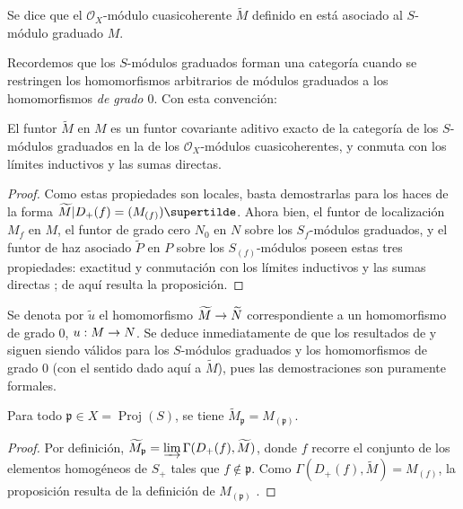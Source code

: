 \documentclass[oneside,10pt]{amsart}
\makeatletter
\newcommand{\ega@arrow}[2]{\mathchoice{#1}{#2}{#2}{#2}}
\renewcommand{\to}{\ega@arrow{\longrightarrow}{\rightarrow}}
\let\EGAOriginalLabel\label
\renewcommand{\label}[1]{\phantomsection\EGAOriginalLabel{#1}}
\makeatother
\begin{document}
\begin{definition}[2.5.3]
\label{II.2.5.3-fr}
Se dice que el $\mathcal{O}_X$-módulo cuasicoherente $\widetilde{M}$ definido en  está asociado al $S$-módulo graduado $M$.
\end{definition}

Recordemos que los $S$-módulos graduados forman una categoría cuando se restringen los homomorfismos arbitrarios de módulos graduados a los homomorfismos \emph{de grado $0$}.
Con esta convención:

\begin{proposition}[2.5.4]
\label{II.2.5.4-fr}
El funtor $\widetilde{M}$ en $M$ es un funtor covariante aditivo exacto de la categoría de los $S$-módulos graduados en la de los $\mathcal{O}_X$-módulos cuasicoherentes, y conmuta con los límites inductivos y las sumas directas.
\end{proposition}

\begin{proof}
Como estas propiedades son locales, basta demostrarlas para los haces de la forma $\widetilde{M}|D_+(f)=(M_{(f)})\supertilde$.
Ahora bien, el funtor de localización $M_f$ en $M$, el funtor de grado cero $N_0$ en $N$ sobre los $S_f$-módulos graduados, y el funtor de haz asociado $\widetilde{P}$ en $P$ sobre los $S_{(f)}$-módulos poseen estas tres propiedades: exactitud y conmutación con los límites inductivos y las sumas directas  ; de aquí resulta la proposición.
\end{proof}

Se denota por $\widetilde{u}$ el homomorfismo $\widetilde{M}\to\widetilde{N}$ correspondiente a un homomorfismo de grado $0$, $u:M\to N$.
Se deduce inmediatamente de  que los resultados de  y  siguen siendo válidos para los $S$-módulos graduados y los homomorfismos de grado $0$ (con el sentido dado aquí a $\widetilde{M}$), pues las demostraciones son puramente formales.

\begin{proposition}[2.5.5]
\label{II.2.5.5-fr}
Para todo $\mathfrak{p}\in X=\operatorname{Proj}(S)$, se tiene $\widetilde{M}_{\mathfrak{p}}=M_{(\mathfrak{p})}$.
\end{proposition}

\begin{proof}
Por definición, $\widetilde{M}_{\mathfrak{p}}=
\varinjlim\Gamma(D_+(f),\widetilde{M})$, donde $f$ recorre el conjunto de los elementos homogéneos de $S_+$ tales que $f\notin\mathfrak{p}$.
Como $\Gamma(D_+(f),\widetilde{M})=M_{(f)}$, la proposición resulta de la definición de $M_{(\mathfrak{p})}$ .
\end{proof}
\end{document}
